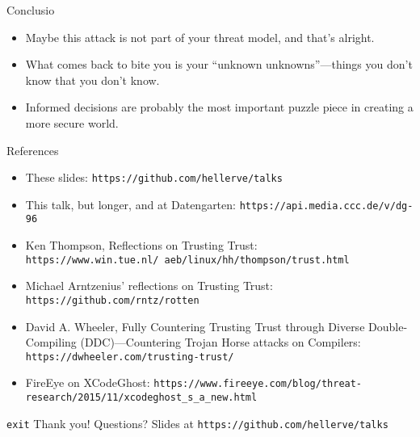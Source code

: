 \documentclass[aspectratio=169]{beamer}
\begin{document}
  \begin{frame}{Conclusio}
    \begin{itemize}
      \item Maybe this attack is not part of your threat model, and that’s
            alright.
      \item What comes back to bite you is your “unknown unknowns”—things you
            don’t know that you don’t know.
      \item Informed decisions are probably the most important puzzle piece in
            creating a more secure world.
    \end{itemize}
  \end{frame}
  \begin{frame}{References}
    \begin{itemize}
      \item These slides: \texttt{https://github.com/hellerve/talks}
      \item This talk, but longer, and at Datengarten: \texttt{https://api.media.ccc.de/v/dg-96}
      \item Ken Thompson, Reflections on Trusting Trust: \texttt{https://www.win.tue.nl/~aeb/linux/hh/thompson/trust.html}
      \item Michael Arntzenius’ reflections on Trusting Trust: \texttt{https://github.com/rntz/rotten}
      \item David A. Wheeler, Fully Countering Trusting Trust through Diverse Double-Compiling (DDC)—Countering Trojan Horse attacks on Compilers: \texttt{https://dwheeler.com/trusting-trust/}
      \item FireEye on XCodeGhost: \texttt{https://www.fireeye.com/blog/threat-research/2015/11/xcodeghost\_s\_a\_new.html}
    \end{itemize}
  \end{frame}
  \begin{frame}{\texttt{exit}}
    \Huge Thank you!
    \linebreak
    \linebreak
    \linebreak
    \small Questions?
    \linebreak
    \linebreak
    \tiny Slides at \texttt{https://github.com/hellerve/talks}
  \end{frame}
\end{document}
